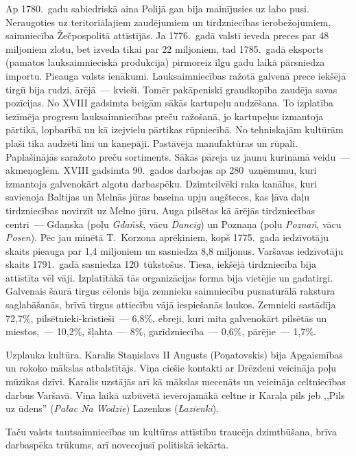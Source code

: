 \documentclass[twoside,a5paper,12pt,fleqn,openany]{extbook}
\newcommand{\pltxti}[1]{\textit{\textpolish{#1}}}
\newcommand{\detxti}[1]{\textit{\textgerman{#1}}}
\begin{document}
Ap 1780.~gadu sabiedriskā aina Polijā gan bija mainījusies uz labo pusi. Neraugoties uz teritoriālajiem zaudējumiem un tirdzniecības ierobežojumiem, saimniecība Žečpospolitā attīstījās. Ja 1776.~gadā valstī ieveda preces par 48 miljoniem zlotu, bet izveda tikai par 22 miljoniem, tad 1785.~gadā eksports (pamatos lauksaimnieciskā produkcija) pirmoreiz ilgu gadu laikā pārsniedza importu. Pieauga valsts ienākumi. Lauksaimniecības ražotā galvenā prece iekšējā tirgū bija rudzi, ārējā~--- kvieši. Tomēr pakāpeniski graudkopība zaudēja savas pozīcijas. No XVIII gadsimta beigām sākās kartupeļu audzēšana. To izplatība iezīmēja progresu lauksaimniecības preču ražošanā, jo kartupeļus izmantoja pārtikā, lopbarībā un kā izejvielu pārtikas rūpniecībā. No tehniskajām kultūrām plaši tika audzēti lini un kaņepāji. Pastāvēja manufaktūras un rūpali. Paplašinājās saražoto preču sortiments. Sākās pāreja uz jaunu kurināmā veidu~--- akmeņoglēm. XVIII gadsimta 90.~gados darbojas ap 280~uzņēmumu, kuri izmantoja galvenokārt algotu darbaspēku. Dzimtcilvēki raka kanālus, kuri savienoja Baltijas un Melnās jūras baseina upju augšteces, kas ļāva daļu tirdzniecības novirzīt uz Melno jūru. Auga pilsētas kā ārējās tirdzniecības centri~--- Gdaņska (poļu \pltxti{Gdańsk}, vācu \detxti{Dancig}) un Poznaņa (poļu \pltxti{Poznań}, vācu \detxti{Posen}). Pēc jau minētā T.~Korzona aprēķiniem, kopš 1775.~gada iedzīvotāju skaits pieauga par 1,4 miljoniem un sasniedza 8,8 miljonus. Varšavas iedzīvotāju skaits 1791.~gadā sasniedza 120~tūkstošus. Tiesa, iekšējā tirdzniecība bija attīstīta vēl vāji. Izplatītākā tās organizācijas forma bija vietējie un gadatirgi. Galvenais šaurā tirgus cēlonis bija zemnieku saimniecību pusnaturālā rakstura saglabāšanās, brīvā tirgus attiecību vājā iespiešanās laukos. Zemnieki sastādīja 72,7\%, pilsētnieki-kristieši~--- 6,8\%, ebreji, kuri mita galvenokārt pilsētās un miestos,~--- 10,2\%, šļahta~--- 8\%, garīdzniecība~--- 0,6\%, pārējie~--- 1,7\%.

Uzplauka kultūra. Karalis Staņislavs II Augusts (Poņatovskis) bija Apgaismības un rokoko mākslas atbalstītājs. Viņa ciešie kontakti ar Drēzdeni veicināja poļu mūzikas dzīvi. Karalis uzstājās arī kā mākslas mecenāts un veicināja celtniecības darbus Varšavā. Viņa laikā uzbūvētā ievērojamākā celtne ir Karaļa pils jeb ,,Pils uz ūdens'' (\pltxti{Pałac Na Wodzie}) Lazenkos (\pltxti{Łazienki}).

Taču valsts tautsaimniecības un kultūras attīstību traucēja dzimtbūšana, brīva darbaspēka trūkums, arī novecojusī politiskā iekārta.
\end{document}
